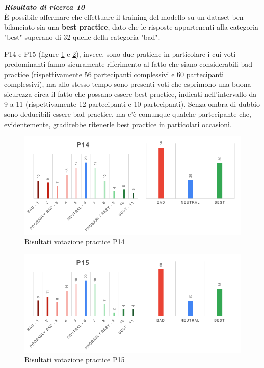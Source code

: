 \begin{center}
    \begin{tcolorbox}[width=400pt, colframe=black, colback=Gray!30]
		\begin{minipage}{\textwidth}
			\textit{\faKey \textbf{ Risultato di ricerca 10}}\\
			È possibile affermare che effettuare il training del modello su un dataset ben bilanciato sia una \textbf{best practice}, dato che le risposte appartenenti alla categoria "best" superano di 32 quelle della categoria "bad".
		\end{minipage}
	\end{tcolorbox}
\end{center}

P14 e P15 (figure \ref{im-a-prac-15} e \ref{im-a-prac-16}), invece, sono due pratiche in particolare i cui voti predominanti fanno sicuramente riferimento al fatto che siano considerabili bad practice (rispettivamente 56 partecipanti complessivi e 60 partecipanti complessivi), ma allo stesso tempo sono presenti voti che esprimono una buona sicurezza circa il fatto che possano essere best practice, indicati nell'intervallo da 9 a 11 (rispettivamente 12 partecipanti e 10 partecipanti). Senza ombra di dubbio sono deducibili essere bad practice, ma c'è comunque qualche partecipante che, evidentemente, gradirebbe ritenerle best practice in particolari occasioni.

\begin{figure}[h!]
    \centering
    \includegraphics[width=1\textwidth]{figure/data-analysis3/P14.png}
    \caption{Risultati votazione practice P14}
    \label{im-a-prac-15}
\end{figure}
\begin{figure}[h!]
    \centering
    \includegraphics[width=1\textwidth]{figure/data-analysis3/P15.png}
    \caption{Risultati votazione practice P15}
    \label{im-a-prac-16}
\end{figure}

